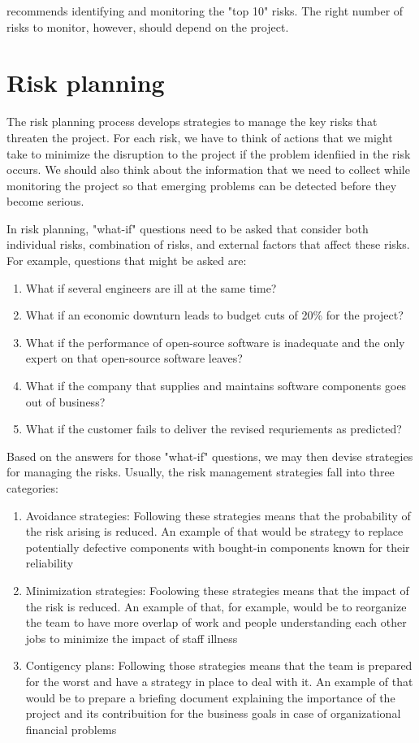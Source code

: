 \cite{spiralModelSoftDev} recommends identifying and monitoring the "top 10" risks. The right number of risks to monitor, however, should depend on the project.

\section{Risk planning}
The risk planning process develops strategies to manage the key risks that threaten the project. For each risk, we have to think of actions that we might take to minimize the disruption to the project if the problem idenfiied in the risk occurs. We should also think about the information that we need to collect while monitoring the project so that emerging problems can be detected before they become serious.

In risk planning, "what-if" questions need to be asked that consider both individual risks, combination of risks, and external factors that affect these risks. For example, questions that might be asked are:
\begin{enumerate}
    \item What if several engineers are ill at the same time?
    \item What if an economic downturn leads to budget cuts of 20\% for the project?
    \item What if the performance of open-source software is inadequate and the only expert on that open-source software leaves?
    \item What if the company that supplies and maintains software components goes out of business?
    \item What if the customer fails to deliver the revised requriements as predicted?
\end{enumerate}

Based on the answers for those "what-if" questions, we may then devise strategies for managing the risks. Usually, the risk management strategies fall into three categories:
\begin{enumerate}
    \item Avoidance strategies: Following these strategies means that the probability of the risk arising is reduced. An example of that would be strategy to replace potentially defective components with bought-in components known for their reliability
    \item Minimization strategies: Foolowing these strategies means that the impact of the risk is reduced. An example of that, for example, would be to reorganize the team to have more overlap of work and people understanding each other jobs to minimize the impact of staff illness
    \item Contigency plans: Following those strategies means that the team is prepared for the worst and have a strategy in place to deal with it. An example of that would be to prepare a briefing document explaining the importance of the project and its contribuition for the business goals in case of organizational financial problems
\end{enumerate}

